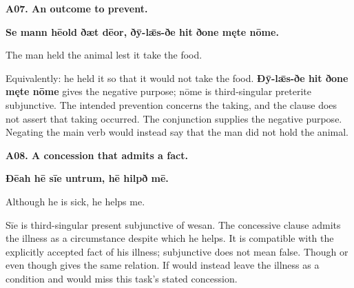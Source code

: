 \par\begin{minipage}{\linewidth}\raggedright
\textbf{A07. An outcome to prevent.}

\textbf{Se mann hēold ðæt dēor, ðȳ-lǣs-ðe hit ðone męte nōme.}

The man held the animal lest it take the food.

Equivalently: he held it so that it would not take the food. \textbf{Ðȳ-lǣs-ðe hit ðone męte nōme} gives the negative purpose; nōme is third-singular preterite subjunctive. The intended prevention concerns the taking, and the clause does not assert that taking occurred. The conjunction supplies the negative purpose. Negating the main verb would instead say that the man did not hold the animal.

\end{minipage}\par\addvspace{4pt}

\par\begin{minipage}{\linewidth}\raggedright
\textbf{A08. A concession that admits a fact.}

\textbf{Ðēah hē sīe untrum, hē hilpð mē.}

Although he is sick, he helps me.

Sīe is third-singular present subjunctive of wesan. The concessive clause admits the illness as a circumstance despite which he helps. It is compatible with the explicitly accepted fact of his illness; subjunctive does not mean false. Though or even though gives the same relation. If would instead leave the illness as a condition and would miss this task's stated concession.

\end{minipage}\par\addvspace{4pt}

